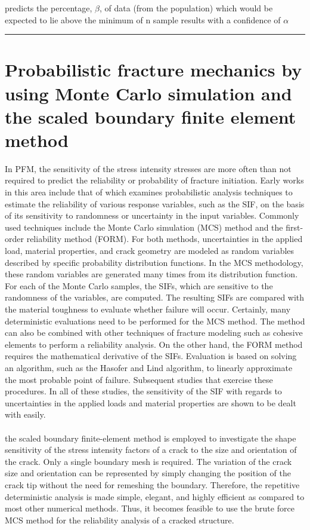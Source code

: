 \documentclass[12pt]{article}
\begin{document}
predicts the percentage, $\beta$, of data (from the population) which would be expected to
lie above the minimum of n sample results with a confidence of $\alpha$
\\\rule{\textwidth}{.1em}
\section{Probabilistic fracture mechanics by using Monte Carlo simulation
and the scaled boundary finite element method}
In PFM, the sensitivity of the stress intensity stresses are more often than not required to predict the 
reliability or probability of fracture initiation. 
Early works in this area include that of which examines probabilistic analysis techniques to estimate the reliability
 of various response variables, such as the SIF, on the basis of its sensitivity to randomness or uncertainty in the
input variables. Commonly used techniques include the Monte Carlo simulation (MCS) method and the first-order reliability
method (FORM). For both methods, uncertainties in the applied load, material properties, and crack geometry are modeled
as random variables described by specific probability distribution functions. In the MCS methodology, these random
variables are generated many times from its distribution function. For each of the Monte Carlo samples, the SIFs, which
are sensitive to the randomness of the variables, are computed. The resulting SIFs are compared with the material toughness
to evaluate whether failure will occur. Certainly, many deterministic evaluations need to be performed for the MCS method.
The method can also be combined with other techniques of fracture modeling such as cohesive elements to perform a
reliability analysis. On the other hand, the FORM method requires the mathematical derivative of the SIFs. Evaluation is
based on solving an algorithm, such as the Hasofer and Lind algorithm, to linearly approximate the most probable point
of failure. Subsequent studies that exercise these procedures. In all of these
studies, the sensitivity of the SIF with regards to uncertainties in the applied loads and material properties are shown to be
dealt with easily.\\\\the scaled boundary finite-element method is employed to investigate the shape sensitivity of the stress
intensity factors of a crack to the size and orientation of the crack. Only a single boundary mesh is required. The variation
of the crack size and orientation can be represented by simply changing the position of the crack tip without the need for
remeshing the boundary. Therefore, the repetitive deterministic analysis is made simple, elegant, and highly efficient as
compared to most other numerical methods. Thus, it becomes feasible to use the brute force MCS method for the reliability
analysis of a cracked structure.
\end{document}
